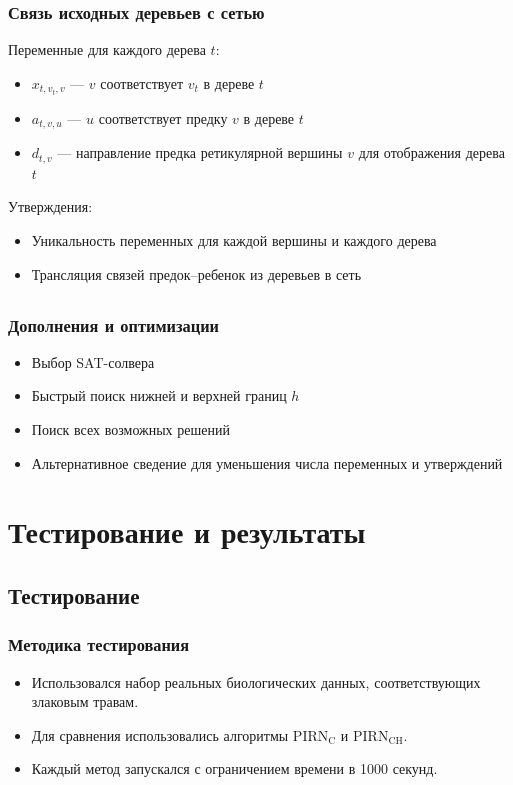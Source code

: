 \documentclass[hyperref={unicode}]{beamer}
\begin{document}
\begin{frame}
\frametitle{Связь исходных деревьев с сетью}

Переменные для каждого дерева $t$:

\begin{itemize}
	\item $x_{t, v_t, v}$ --- $v$ соответствует $v_t$ в дереве $t$
	\item $a_{t, v, u}$ --- $u$ соответствует предку $v$ в дереве $t$
	\item $d_{t, v}$ --- направление предка ретикулярной вершины $v$ для отображения дерева $t$
\end{itemize}

Утверждения:
\begin{itemize}
	\item Уникальность переменных для каждой вершины и каждого дерева
	\item Трансляция связей предок--ребенок из деревьев в сеть
\end{itemize}

\end{frame}

\subsection{}

\begin{frame}
\frametitle{Дополнения и оптимизации}

\begin{itemize}
	\item Выбор SAT-солвера
	\item Быстрый поиск нижней и верхней границ $h$
	\item Поиск всех возможных решений
	\item Альтернативное сведение для уменьшения числа переменных и утверждений
\end{itemize}

\end{frame}

\section{Тестирование и результаты}

\subsection{Тестирование}

\begin{frame}
\frametitle{Методика тестирования}

\begin{itemize}
	\item Использовался набор реальных биологических данных, соответствующих злаковым травам.
	\item Для сравнения использовались алгоритмы $\mathrm{PIRN_C}$ и $\mathrm{PIRN_{CH}}$.
	\item Каждый метод запускался с ограничением времени в 1000 секунд.
\end{itemize}

\end{frame}
\end{document}
